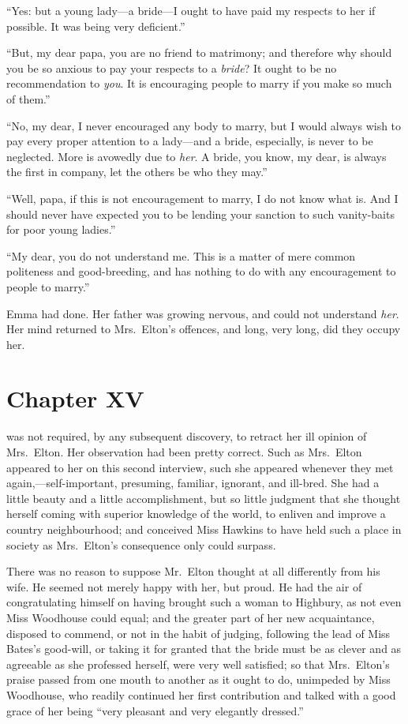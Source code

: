 ``Yes:  but a young lady---a bride---I ought to have paid my respects
to her if possible.  It was being very deficient.''

``But, my dear papa, you are no friend to matrimony; and therefore
why should you be so anxious to pay your respects to a \emph{bride}?
It ought to be no recommendation to \emph{you}.  It is encouraging people
to marry if you make so much of them.''

``No, my dear, I never encouraged any body to marry, but I would
always wish to pay every proper attention to a lady---and a bride,
especially, is never to be neglected.  More is avowedly due to \emph{her}.
A bride, you know, my dear, is always the first in company,
let the others be who they may.''

``Well, papa, if this is not encouragement to marry, I do not know
what is.  And I should never have expected you to be lending your
sanction to such vanity-baits for poor young ladies.''

``My dear, you do not understand me.  This is a
matter of mere common politeness and good-breeding,
and has nothing to do with any encouragement to people to marry.''

Emma had done.  Her father was growing nervous, and could not
understand \emph{her}.  Her mind returned to Mrs.\ Elton's offences,
and long, very long, did they occupy her.



\chapter{Chapter XV}


 was not required, by any subsequent discovery, to retract her ill
opinion of Mrs.\ Elton.  Her observation had been pretty correct.
Such as Mrs.\ Elton appeared to her on this second interview,
such she appeared whenever they met again,---self-important, presuming,
familiar, ignorant, and ill-bred. She had a little beauty and a
little accomplishment, but so little judgment that she thought herself
coming with superior knowledge of the world, to enliven and improve
a country neighbourhood; and conceived Miss Hawkins to have held
such a place in society as Mrs.\ Elton's consequence only could surpass.

There was no reason to suppose Mr.\ Elton thought at all differently
from his wife.  He seemed not merely happy with her, but proud.
He had the air of congratulating himself on having brought such
a woman to Highbury, as not even Miss Woodhouse could equal;
and the greater part of her new acquaintance, disposed to commend,
or not in the habit of judging, following the lead of Miss Bates's
good-will, or taking it for granted that the bride must be as clever
and as agreeable as she professed herself, were very well satisfied;
so that Mrs.\ Elton's praise passed from one mouth to another as it
ought to do, unimpeded by Miss Woodhouse, who readily continued her
first contribution and talked with a good grace of her being ``very
pleasant and very elegantly dressed.''

